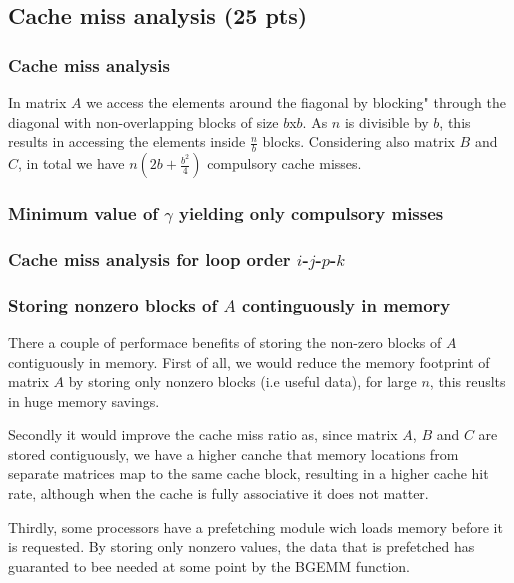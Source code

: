\subsection{Cache miss analysis (25 pts)}
\subsubsection{Cache miss analysis}
In matrix $A$ we access the elements around the fiagonal by blocking" through the diagonal with non-overlapping blocks of size $b$x$b$. As $n$ is divisible by $b$, this results in accessing the elements inside $\frac{n}{b}$ blocks. Considering also matrix $B$ and $C$, in total we have $n(2b+\frac{b^2}{4})$ compulsory cache misses.

\subsubsection{Minimum value of $\gamma$ yielding only compulsory misses}


\subsubsection{Cache miss analysis for loop order $i$-$j$-$p$-$k$}


\subsubsection{Storing nonzero blocks of $A$ continguously in memory}
There a couple of performace benefits of storing the non-zero blocks of $A$ contiguously in memory. First of all, we would reduce the memory footprint of matrix $A$ by storing only nonzero blocks (i.e useful data), for large $n$, this reuslts in huge memory savings.

Secondly it would improve the cache miss ratio as, since matrix $A$, $B$ and $C$ are stored contiguously, we have a higher canche that memory locations from separate matrices map to the same cache block, resulting in a higher cache hit rate, although when the cache is fully associative it does not matter.

Thirdly, some processors have a prefetching module wich loads memory before it is requested. By storing only nonzero values, the data that is prefetched has guaranted to bee needed at some point by the BGEMM function.
